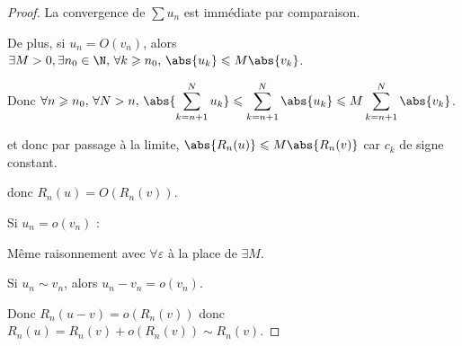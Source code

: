 \begin{proof}
    La convergence de $\sum u_n$ est immédiate par comparaison. 

    De plus, si $u_n =  O(v_n)$, alors $\exists M > 0, \exists n_0 \in \N, \, \forall k \geqslant n_0, \, \abs{u_k} \leqslant M \abs{v_k}$.

    Donc $\displaystyle \forall n \geqslant n_0, \, \forall N > n, \, \abs{\sum_{k = n + 1 }^{N } u_k} \leqslant \sum_{k = n + 1 }^{N } \abs{u_k} \leqslant M \sum_{k = n + 1}^{N } \abs{v_k}$.

    et donc par passage à la limite, $\abs{R_n(u)} \leqslant M \abs{R_n(v)}$ car $c_k$ de signe constant. 

    donc $R_n(u) = O(R_n(v))$.

    \lvspace Si $u_n = o(v_n)$ : 

    Même raisonnement avec $\forall \varepsilon$ à la place de $\exists M$. 

    \lvspace Si $u_n \sim v_n$, alors $u_n - v_n = o(v_n)$. 

    Donc $R_n(u - v) = o(R_n(v))$ donc $R_n(u) = R_n(v) + o(R_n(v)) \sim R_n(v)$.
\end{proof}


